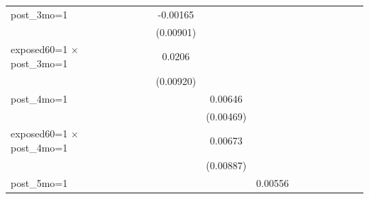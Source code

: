 \begin{table}[htbp]
\begin{tabular}{l*{11}{c}}
\addlinespace
post\_3mo=1          &                     &    -0.00165         &                     &                     &                     &                     &                     &                     &                     &                     &                     \\
                    &                     &   (0.00901)         &                     &                     &                     &                     &                     &                     &                     &                     &                     \\
\addlinespace
exposed60=1 $\times$ post\_3mo=1&                     &      0.0206\sym{*}  &                     &                     &                     &                     &                     &                     &                     &                     &                     \\
                    &                     &   (0.00920)         &                     &                     &                     &                     &                     &                     &                     &                     &                     \\
\addlinespace
post\_4mo=1          &                     &                     &     0.00646         &                     &                     &                     &                     &                     &                     &                     &                     \\
                    &                     &                     &   (0.00469)         &                     &                     &                     &                     &                     &                     &                     &                     \\
\addlinespace
exposed60=1 $\times$ post\_4mo=1&                     &                     &     0.00673         &                     &                     &                     &                     &                     &                     &                     &                     \\
                    &                     &                     &   (0.00887)         &                     &                     &                     &                     &                     &                     &                     &                     \\
\addlinespace
post\_5mo=1          &                     &                     &                     &     0.00556         &                     &                     &                     &                     &                     &                     &                     \\

\end{tabular}
\end{table}
